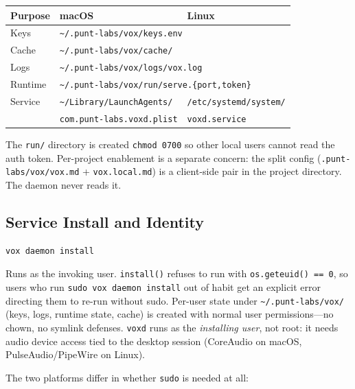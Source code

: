 \documentclass[a4paper,10pt]{article}
\begin{document}
\begin{center}
\begin{tabular}{lll}
\toprule
\textbf{Purpose} & \textbf{macOS} & \textbf{Linux} \\
\midrule
Keys     & \multicolumn{2}{l}{\texttt{\~{}/.punt-labs/vox/keys.env}} \\
Cache    & \multicolumn{2}{l}{\texttt{\~{}/.punt-labs/vox/cache/}} \\
Logs     & \multicolumn{2}{l}{\texttt{\~{}/.punt-labs/vox/logs/vox.log}} \\
Runtime  & \multicolumn{2}{l}{\texttt{\~{}/.punt-labs/vox/run/serve.\{port,token\}}} \\
Service  & \texttt{\~{}/Library/LaunchAgents/}
         & \texttt{/etc/systemd/system/} \\
         & \texttt{com.punt-labs.voxd.plist}
         & \texttt{voxd.service} \\
\bottomrule
\end{tabular}
\end{center}

The \texttt{run/} directory is created \texttt{chmod 0700} so other
local users cannot read the auth token.  Per-project enablement is a
separate concern: the split config
(\texttt{.punt-labs/vox/vox.md} + \texttt{vox.local.md}) is a
client-side pair in the project directory.  The daemon never reads it.

\subsection{Service Install and Identity}

\begin{verbatim}
vox daemon install
\end{verbatim}

Runs as the invoking user.  \texttt{install()} refuses to run with
\texttt{os.geteuid() == 0}, so users who run \texttt{sudo vox daemon
install} out of habit get an explicit error directing them to
re-run without sudo.  Per-user state under
\texttt{\textasciitilde/.punt-labs/vox/} (keys, logs, runtime state,
cache) is created with normal user permissions---no chown, no
symlink defenses.  \texttt{voxd} runs as the \emph{installing user},
not root: it needs audio device access tied to the desktop session
(CoreAudio on macOS, PulseAudio/PipeWire on Linux).

The two platforms differ in whether \texttt{sudo} is needed at all:
\end{document}
